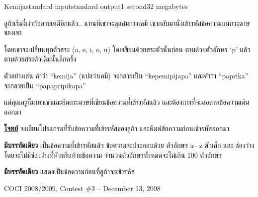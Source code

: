 \documentclass[11pt,a4paper]{article}
\begin{document}
\begin{problem}{Kemija}{standard input}{standard output}{1 second}{32 megabytes}

ลูก้าเริ่มงี่เง่ากับคาบเคมีอีกแล้ว.. แทนที่เขาจะดุลสมการเคมี เขากลับมานั่งเข้ารหัสข้อความบนกระดาษของเขา

โดยเขาจะเปลี่ยนทุกตัวสระ (a, e, i, o, u) โดยเขียนด้วยสระตัวนั้นก่อน ตามด้วยตัวอักษร ‘p’ แล้วตามด้วยสระตัวเดิมนั้นอีกครั้ง

ตัวอย่างเช่น คำว่า “kemija” (แปลว่าเคมี) จะกลายเป็น “kepemipijapa”
และคำว่า “paprika” จะกลายเป็น “papapripikapa”

แต่คุณครูก็มาหาเขาและยึดกระดาษที่เขียนข้อความที่เข้ารหัสแล้ว และต้องการที่จะถอดหาข้อความเดิมออกมา

\underline{\textbf{โจทย์}} จงเขียนโปรแกรมที่รับข้อความที่เข้ารหัสของลูก้า และพิมพ์ข้อความก่อนเข้ารหัสออกมา

\InputFile

\textbf{มีบรรทัดเดียว} เป็นข้อความที่เข้ารหัสแล้ว ข้อความจะประกอบด้วย ตัวอักษร a$-$z ตัวเล็ก และ ช่องว่าง โดยจะไม่มีช่องว่างที่หัวหรือท้ายข้อความ จำนวนตัวอักษรทั้งหมดจะไม่เกิน $100$ ตัวอักษร


\OutputFile

\textbf{มีบรรทัดเดียว} แสดงเป็นข้อความก่อนที่ลูก้าจะเข้ารหัส

\Examples

\begin{example}
%
%
\end{example}


\Source

COCI 2008/2009, Contest \#3 – December 13, 2008



\end{problem}
\end{document}
